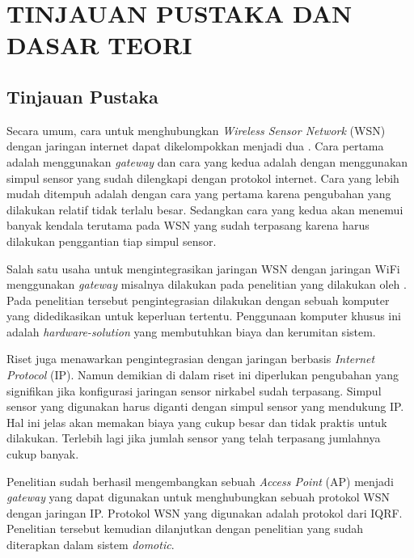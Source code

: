 
\chapter{TINJAUAN PUSTAKA DAN DASAR TEORI}                

\section{Tinjauan Pustaka}
  Secara umum, cara untuk menghubungkan \emph{Wireless Sensor Network} (WSN) dengan jaringan internet dapat dikelompokkan menjadi dua \cite{Rodrigues2010}. Cara pertama adalah menggunakan \emph{gateway} \cite{DaSilvaCampos2011} dan cara yang kedua adalah dengan menggunakan simpul sensor yang sudah dilengkapi dengan protokol internet. Cara yang lebih mudah ditempuh adalah dengan cara yang pertama karena pengubahan yang dilakukan relatif tidak terlalu besar. Sedangkan cara yang kedua akan menemui banyak kendala terutama pada WSN yang sudah terpasang karena harus dilakukan penggantian tiap simpul sensor.

  Salah satu usaha untuk mengintegrasikan jaringan WSN dengan jaringan WiFi menggunakan \emph{gateway} misalnya dilakukan pada penelitian yang dilakukan oleh \cite{Spinar2009}. Pada penelitian tersebut pengintegrasian dilakukan dengan sebuah komputer yang didedikasikan untuk keperluan tertentu. Penggunaan komputer khusus ini adalah \emph{hardware-solution} yang membutuhkan biaya dan kerumitan sistem.

  Riset \cite{Dunkels2004} juga menawarkan pengintegrasian dengan jaringan berbasis \emph{Internet Protocol} (IP). Namun demikian di dalam riset ini diperlukan pengubahan yang signifikan jika konfigurasi jaringan sensor nirkabel sudah terpasang. Simpul sensor yang digunakan harus diganti dengan simpul sensor yang mendukung IP. Hal ini jelas akan memakan biaya yang cukup besar dan tidak praktis untuk dilakukan. Terlebih lagi jika jumlah sensor yang telah terpasang jumlahnya cukup banyak.

  Penelitian \cite{wibowo2013wireless} sudah berhasil mengembangkan sebuah \emph{Access Point} (AP) menjadi \emph{gateway} yang dapat digunakan untuk menghubungkan sebuah protokol WSN dengan jaringan IP. Protokol WSN yang digunakan adalah protokol dari IQRF. Penelitian tersebut kemudian dilanjutkan dengan penelitian \cite{widyawan2012ihome} yang sudah diterapkan dalam sistem \emph{domotic}.

